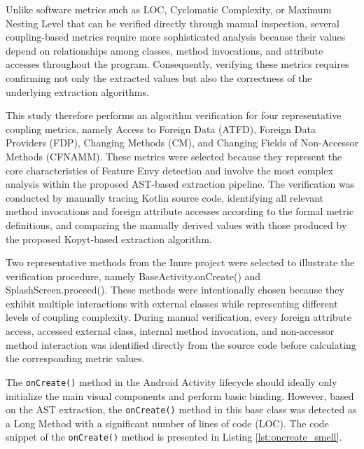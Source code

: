 \documentclass[]{einformatica}
\begin{document}
Unlike software metrics such as LOC, Cyclomatic Complexity, or Maximum Nesting Level that can be verified directly through manual inspection, several coupling-based metrics require more sophisticated analysis because their values depend on relationships among classes, method invocations, and attribute accesses throughout the program. Consequently, verifying these metrics requires confirming not only the extracted values but also the correctness of the underlying extraction algorithms.

This study therefore performs an algorithm verification for four representative coupling metrics, namely Access to Foreign Data (ATFD), Foreign Data Providers (FDP), Changing Methods (CM), and Changing Fields of Non-Accessor Methods (CFNAMM). These metrics were selected because they represent the core characteristics of Feature Envy detection and involve the most complex analysis within the proposed AST-based extraction pipeline. The verification was conducted by manually tracing Kotlin source code, identifying all relevant method invocations and foreign attribute accesses according to the formal metric definitions, and comparing the manually derived values with those produced by the proposed Kopyt-based extraction algorithm.

Two representative methods from the Inure project were selected to illustrate the verification procedure, namely BaseActivity.onCreate() and SplashScreen.proceed(). These methods were intentionally chosen because they exhibit multiple interactions with external classes while representing different levels of coupling complexity. During manual verification, every foreign attribute access, accessed external class, internal method invocation, and non-accessor method interaction was identified directly from the source code before calculating the corresponding metric values.

The \texttt{onCreate()} method in the Android Activity lifecycle should ideally only initialize the main visual components and perform basic binding. However, based on the AST extraction, the \texttt{onCreate()} method in this base class was detected as a Long Method with a significant number of lines of code (LOC). The code snippet of the \texttt{onCreate()} method is presented in Listing \ref{lst:oncreate_smell}.
\end{document}
